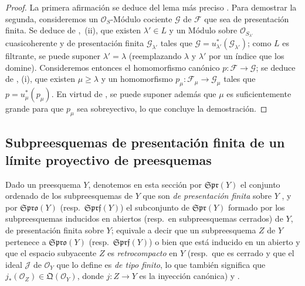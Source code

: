 \begin{proof}
La primera afirmación se deduce del lema más preciso . Para demostrar la segunda, consideremos un $\mathcal O_S$-Módulo cociente $\mathcal G$ de $\mathcal F$ que sea de presentación finita. Se deduce de ,~(ii), que existen $\lambda'\in L$ y un Módulo sobre $\mathcal O_{S_{\lambda'}}$ cuasicoherente y de presentación finita $\mathcal G_{\lambda'}$ tales que $\mathcal G=u_{\lambda'}^*(\mathcal G_{\lambda'})$; como $L$ es filtrante, se puede suponer $\lambda'=\lambda$ (reemplazando $\lambda$ y $\lambda'$ por un índice que los domine). Consideremos entonces el homomorfismo canónico $p:\mathcal F\to\mathcal G$; se deduce de , (i), que existen $\mu\geq\lambda$ y un homomorfismo $p_\mu:\mathcal F_\mu\to\mathcal G_\mu$ tales que $p=u_\mu^*(p_\mu)$. En virtud de , se puede suponer además que $\mu$ es suficientemente grande para que $p_\mu$ sea sobreyectivo, lo que concluye la demostración.
\end{proof}

\subsection{Subpreesquemas de presentación finita de un límite proyectivo de preesquemas}
\label{subsection:IV.8.6-fr}

\begin{env}[8.6.1]
\label{IV.8.6.1-fr}
Dado un preesquema $Y$, denotemos en esta sección por $\mathfrak{Spr}(Y)$ el conjunto ordenado
 de los subpreesquemas de $Y$ que son \emph{de presentación finita} sobre $Y$ , y por $\mathfrak{Spro}(Y)$ (resp.\ $\mathfrak{Sprf}(Y)$) el subconjunto de $\mathfrak{Spr}(Y)$ formado por los subpreesquemas inducidos en abiertos (resp.\ en subpreesquemas cerrados) de $Y$, de presentación finita sobre $Y$; equivale a decir que un subpreesquema $Z$ de $Y$ pertenece a $\mathfrak{Spro}(Y)$ (resp.\ $\mathfrak{Sprf}(Y)$) o bien que está inducido en un abierto y que el espacio subyacente $Z$ es \emph{retrocompacto} en $Y$ (resp.\ que es cerrado y que el ideal $\mathcal J$ de $\mathcal O_Y$ que lo define es \emph{de tipo finito}, lo que también significa que $j_*(\mathcal O_Z)\in\mathfrak Q(\mathcal O_Y)$, donde $j:Z\to Y$ es la inyección canónica)  y .
\end{env}

